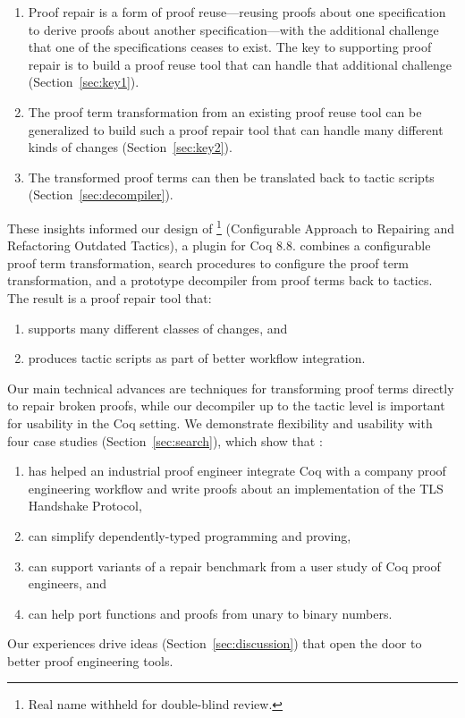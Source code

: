 \begin{enumerate}
\item Proof repair is a form of proof reuse---reusing proofs about one specification to derive proofs about another specification---with 
the additional challenge that one of the specifications ceases to exist.
The key to supporting proof repair is to build a proof reuse
tool that can handle that additional challenge (Section~\ref{sec:key1}). 
\item The proof term transformation from an existing proof reuse tool can be generalized
to build such a proof repair tool that can handle many different kinds of changes (Section~\ref{sec:key2}).
\item The transformed proof terms can then be translated back to tactic scripts (Section~\ref{sec:decompiler}).
\end{enumerate}

These insights informed our design of 
\toolname\footnote{Real name withheld for double-blind review.} (Configurable Approach to Repairing and Refactoring Outdated Tactics), a plugin for Coq 8.8.
\toolname combines a configurable proof term transformation,
search procedures to configure the proof term transformation,
and a prototype decompiler from proof terms back to tactics.
The result is a proof repair tool that:

\begin{enumerate}
\item supports many different classes of changes, and
\item produces tactic scripts as part of better workflow integration.
\end{enumerate}
Our main technical advances are techniques for transforming proof terms directly to repair broken proofs, while our decompiler up to the tactic level is important for usability in the Coq setting.
We demonstrate flexibility and usability with four case studies (Section~\ref{sec:search}), which show that \toolname:

\begin{enumerate}
\item has helped an industrial proof engineer integrate Coq with a company proof engineering workflow and write proofs about an implementation
of the TLS Handshake Protocol,
\item can simplify dependently-typed programming and proving,
\item can support variants of a repair benchmark from a user study of Coq proof engineers, and
\item can help port functions and proofs from unary to binary numbers.
\end{enumerate}
Our experiences drive ideas (Section~\ref{sec:discussion}) that open the door to better proof engineering tools.

